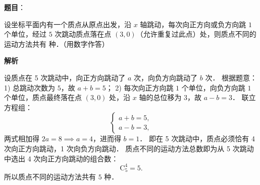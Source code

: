 \begin{answer}

\textbf{题目}：

设坐标平面内有一个质点从原点出发，沿 $x$ 轴跳动，每次向正方向或负方向跳 $1$ 个单位，经过 $5$ 次跳动质点落在点 $(3, 0)$（允许重复过此点）处，则质点不同的运动方法共有 \underline{\hspace{3cm}} 种．（用数字作答）

\textbf{解析}

设质点在 5 次跳动中，向正方向跳动了 $a$ 次，向负方向跳动了 $b$ 次．
根据题意：
1) 总跳动次数为 $5$，故 $a + b = 5$；
2) 每次向正方向跳 $1$ 个单位，向负方向跳 $1$ 个单位，质点最终落在点 $(3, 0)$ 处，沿 $x$ 轴的总位移为 $3$，故 $a - b = 3$．
联立方程组：
\nopagebreak[4]
\[
\begin{cases} a + b = 5, \\ a - b = 3, \end{cases}
\]
两式相加得 $2a = 8 \implies a = 4$，进而得 $b = 1$．
即在 5 次跳动中，质点必须恰有 4 次向正方向跳动，1 次向负方向跳动．
质点不同的运动方法总数即为从 5 次跳动中选出 4 次向正方向跳动的组合数：
\nopagebreak[4]
\[
\mathrm{C}_5^4 = 5.
\]
所以质点不同的运动方法共有 $5$ 种．


\end{answer}

